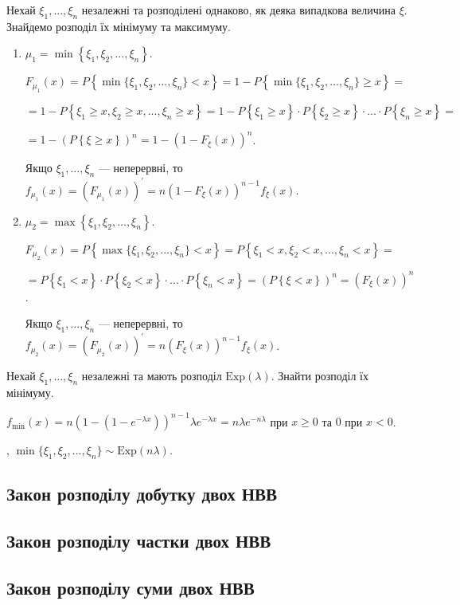 Нехай $\xi_1, ..., \xi_n$ незалежні та розподілені однаково, як деяка випадкова величина $\xi$.
Знайдемо розподіл їх мінімуму та максимуму.
\begin{enumerate}
    \item $\mu_1 = \min\left\{\xi_1, \xi_2, ..., \xi_n\right\}$.

    $F_{\mu_1} (x) = P \left\{ \min\{\xi_1, \xi_2, ..., \xi_n\} < x \right\} =
    1 - P \left\{ \min\{\xi_1, \xi_2, ..., \xi_n\} \geq x \right\} =$

    $ = 1 - P \left\{ \xi_1 \geq x, \xi_2 \geq x, ..., \xi_n \geq x \right\} = 
    1 - P\left\{ \xi_1 \geq x\right\} \cdot P\left\{ \xi_2 \geq x\right\} \cdot ... \cdot P\left\{ \xi_n \geq x\right\} = $
    
    $ = 1 - (P\left\{ \xi \geq x\right\})^n = 1 - (1- F_\xi (x))^n$.

    Якщо $\xi_1, ..., \xi_n$ --- неперервні, то $f_{\mu_1} (x) = \left( F_{\mu_1} (x)\right)^\prime = n (1- F_\xi (x))^{n-1} f_\xi(x)$.
    \item $\mu_2 = \max\left\{\xi_1, \xi_2, ..., \xi_n\right\}$.

    $F_{\mu_2} (x) = P \left\{ \max\{\xi_1, \xi_2, ..., \xi_n\} < x \right\} =
    P \left\{ \xi_1 < x, \xi_2 < x, ..., \xi_n < x \right\} = $

    $ = P\left\{ \xi_1 < x\right\} \cdot P\left\{ \xi_2 < x\right\} \cdot ... \cdot P\left\{ \xi_n < x\right\} =
    (P\left\{ \xi < x\right\})^n = (F_\xi (x))^n$.

    Якщо $\xi_1, ..., \xi_n$ --- неперервні, то $f_{\mu_2} (x) = \left( F_{\mu_2} (x)\right)^\prime = n (F_\xi (x))^{n-1} f_\xi(x)$.
\end{enumerate}

\begin{example}
    Нехай $\xi_1, ..., \xi_n$ незалежні та мають розподіл $\mathrm{Exp}(\lambda)$. Знайти розподіл їх мінімуму.

    \noindent$f_{\min}(x) = n (1-(1-e^{-\lambda x}))^{n-1} \lambda e^{-\lambda x} = n \lambda e^{-n\lambda}$ при $x \geq 0$ та $0$ при $x < 0$.
    
    , $\min\{\xi_1, \xi_2, ..., \xi_n\} \sim \mathrm{Exp} (n \lambda)$.
\end{example}

\subsection{Закон розподілу добутку двох НВВ}

\subsection{Закон розподілу частки двох НВВ}

\subsection{Закон розподілу суми двох НВВ}